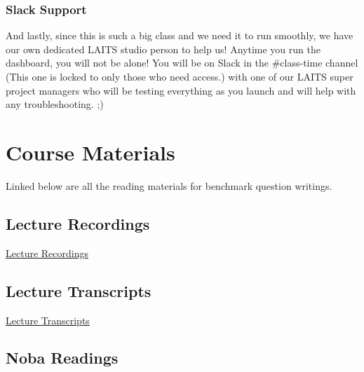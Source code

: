 \documentclass[
]{article}
\begin{document}
\hypertarget{slack-support}{%
\subsubsection{Slack Support}\label{slack-support}}

And lastly, since this is such a big class and we need it to run smoothly, we have our own dedicated LAITS studio person to help us! Anytime you run the dashboard, you will not be alone! You will be on Slack in the \#class-time channel (This one is locked to only those who need access.) with one of our LAITS super project managers who will be testing everything as you launch and will help with any troubleshooting. ;)

\hypertarget{course-materials}{%
\section{Course Materials}\label{course-materials}}

Linked below are all the reading materials for benchmark question writings.

\hypertarget{lecture-recordings}{%
\subsection{Lecture Recordings}\label{lecture-recordings}}

\href{https://utexas.instructure.com/courses/1407493/modules}{Lecture Recordings}

\hypertarget{lecture-transcripts}{%
\subsection{Lecture Transcripts}\label{lecture-transcripts}}

\href{https://utexas.app.box.com/folder/301841199745?s=h9lcrvgqmm9zi43g8qo8ctfzcz4yq7wt}{Lecture Transcripts}

\hypertarget{noba-readings}{%
\subsection{Noba Readings}\label{noba-readings}}
\end{document}

